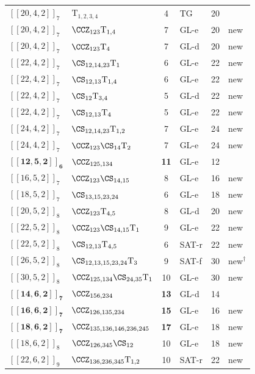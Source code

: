 \begin{table}[tbp]
\begin{tabular}{l l c l c l}
$[[20,4,2]]_{7}$ & $\mathrm{T}_{1,2,3,4}$ & 4 & TG & 20 & \cite{bravyi2012magic} \\
$[[20,4,2]]_{7}$ & $\CCZ_{123}\mathrm{T}_{1,4}$ & 7 & GL-e & 20 & new \\
$[[20,4,2]]_{7}$ & $\CCZ_{123}\mathrm{T}_{4}$ & 7 & GL-d & 20 & new \\
$[[22,4,2]]_{7}$ & $\CS_{12,14,23}\mathrm{T}_{1}$ & 6 & GL-e & 22 & new \\
$[[22,4,2]]_{7}$ & $\CS_{12,13}\mathrm{T}_{1,4}$ & 6 & GL-e & 22 & new \\
$[[22,4,2]]_{7}$ & $\CS_{12}\mathrm{T}_{3,4}$ & 5 & GL-d & 22 & new \\
$[[22,4,2]]_{7}$ & $\CS_{12,13}\mathrm{T}_{4}$ & 5 & GL-e & 22 & new \\
$[[24,4,2]]_{7}$ & $\CS_{12,14,23}\mathrm{T}_{1,2}$ & 7 & GL-e & 24 & new \\
$[[24,4,2]]_{7}$ & $\CCZ_{123}\CS_{14}\mathrm{T}_{2}$ & 7 & GL-e & 24 & new \\
$\mathbf{[[12,5,2]]_{6}}$ & $\CCZ_{125,134}$ & \textbf{11} & GL-e & 12 & \cite{campbell2017unified} \\
$[[16,5,2]]_{7}$ & $\CCZ_{123}\CS_{14,15}$ & 8 & GL-e & 16 & new \\
$[[18,5,2]]_{7}$ & $\CS_{13,15,23,24}$ & 6 & GL-e & 18 & new \\
$[[20,5,2]]_{8}$ & $\CCZ_{123}\mathrm{T}_{4,5}$ & 8 & GL-d & 20 & new \\
$[[22,5,2]]_{8}$ & $\CCZ_{123}\CS_{14,15}\mathrm{T}_{1}$ & 9 & GL-e & 22 & new \\
$[[22,5,2]]_{8}$ & $\CS_{12,13}\mathrm{T}_{4,5}$ & 6 & SAT-r & 22 & new \\
$[[26,5,2]]_{8}$ & $\CS_{12,13,15,23,24}\mathrm{T}_{3}$ & 9 & SAT-f & 30 & new$^\dagger$ \\
$[[30,5,2]]_{8}$ & $\CCZ_{125,134}\CS_{24,35}\mathrm{T}_{1}$ & 10 & GL-e & 30 & new \\
$\mathbf{[[14,6,2]]_{7}}$ & $\CCZ_{156,234}$ & \textbf{13} & GL-d & 14 & \cite{campbell2017unified} \\
$\mathbf{[[16,6,2]]_{7}}$ & $\CCZ_{126,135,234}$ & \textbf{15} & GL-e & 16 & new \\
$\mathbf{[[18,6,2]]_{7}}$ & $\CCZ_{135,136,146,236,245}$ & \textbf{17} & GL-e & 18 & new \\
$[[18,6,2]]_{8}$ & $\CCZ_{126,345}\CS_{12}$ & 10 & GL-e & 18 & new \\
$[[22,6,2]]_{9}$ & $\CCZ_{136,236,345}\mathrm{T}_{1,2}$ & 10 & SAT-r & 22 & new \\

\end{tabular}
\end{table}
